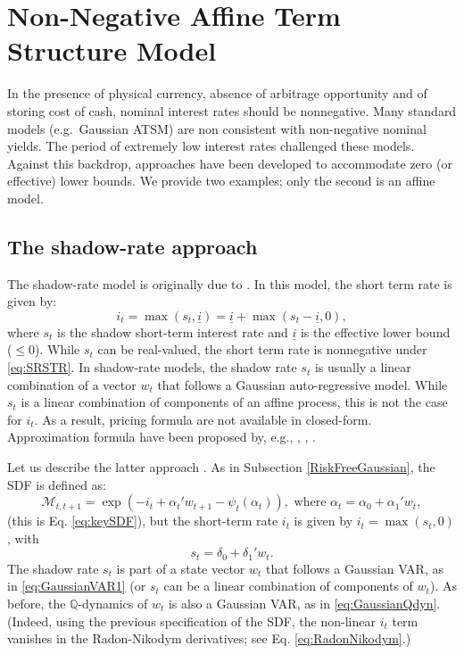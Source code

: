 \documentclass[
  12pt,
]{book}
\theoremstyle{definition}
\theoremstyle{definition}
\theoremstyle{definition}
\theoremstyle{definition}
\theoremstyle{remark}
\begin{document}
\hypertarget{RiskFreeNonNegative}{%
\section{Non-Negative Affine Term Structure Model}\label{RiskFreeNonNegative}}

In the presence of physical currency, absence of arbitrage opportunity and of storing cost of cash, nominal interest rates should be nonnegative. Many standard models (e.g.~Gaussian ATSM) are non consistent with non-negative nominal yields. The period of extremely low interest rates challenged these models. Against this backdrop, approaches have been developed to accommodate zero (or effective) lower bounds. We provide two examples; only the second is an affine model.

\hypertarget{Shadowrate}{%
\subsection{The shadow-rate approach}\label{Shadowrate}}

The shadow-rate model is originally due to \citet{Black_1995}. In this model, the short term rate is given by:
\begin{equation}
i_t = \max(s_t,\underline{i}) = \underline{i} + \max(s_t-\underline{i},0),\label{eq:SRSTR}
\end{equation}
where \(s_t\) is the shadow short-term interest rate and \(\underline{i}\) is the effective lower bound (\(\le 0\)). While \(s_t\) can be real-valued, the short term rate is nonnegative under \eqref{eq:SRSTR}. In shadow-rate models, the shadow rate \(s_t\) is usually a linear combination of a vector \(w_t\) that follows a Gaussian auto-regressive model. While \(s_t\) is a linear combination of components of an affine process, this is not the case for \(i_t\). As a result, pricing formula are not available in closed-form. Approximation formula have been proposed by, e.g., \citet{Krippner_2013}, \citet{Priebsch_2013}, \citet{Wu_Xia_2016}.

Let us describe the latter approach \citep{Wu_Xia_2016}. As in Subsection \ref{RiskFreeGaussian}, the SDF is defined as:
\[
\mathcal{M}_{t,t+1} = \exp(- i_t + \alpha_t'w_{t+1} - \psi_t(\alpha_t)), \mbox{ where } \alpha_t = \alpha_0 + \alpha_1'w_t,
\]
(this is Eq. \eqref{eq:keySDF}), but the short-term rate \(i_t\) is given by \(i_t = \max(s_t,0)\), with
\[
s_t = \delta_0 + \delta_1' w_t.
\]
The shadow rate \(s_t\) is part of a state vector \(w_t\) that follows a Gaussian VAR, as in \eqref{eq:GaussianVAR1} (or \(s_t\) can be a linear combination of components of \(w_t\)). As before, the \(\mathbb{Q}\)-dynamics of \(w_t\) is also a Gaussian VAR, as in \eqref{eq:GaussianQdyn}. (Indeed, using the previous specification of the SDF, the non-linear \(i_t\) term vanishes in the Radon-Nikodym derivatives; see Eq. \eqref{eq:RadonNikodym}.)
\end{document}
